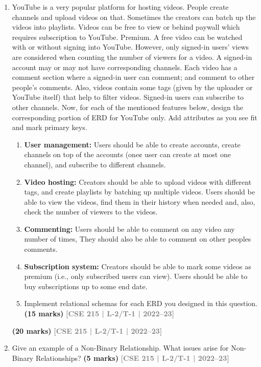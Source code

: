 \documentclass[12pt,a3paper]{article}
\newcommand{\yr}[1]{\hfill\textcolor{gray}{\small\textbf{[#1]}}}
\newcommand{\mk}[1]{\textcolor{orange!70!black}{\small\textbf{(#1 marks)}}}
\begin{document}
\begin{enumerate}
\item YouTube is a very popular platform for hosting videos. People create channels and
upload videos on that. Sometimes the creators can batch up the videos into playlists.
Videos can be free to view or behind paywall which requires subscription to YouTube.
Premium. A free video can be watched with or without signing into YouTube. However,
only signed-in users' views are considered when counting the number of viewers for a
video. A signed-in account may or may not have corresponding channels. Each video has
a comment section where a signed-in user can comment; and comment to other people’s
comments. Also, videos contain some tags (given by the uploader or YouTube itself) that
help to filter videos. Signed-in users can subscribe to other channels. Now, for each of the
mentioned features below, design the corresponding portion of ERD for YouTube only.
Add attributes as you see fit and mark primary keys.
\begin{enumerate}
  \item \textbf{User management:} Users should be able to create accounts, create channels on top of
the accounts (one¢ user can create at most one channel), and subscribe to different
channels.
  \item \textbf{Video hosting:} Creators should be able to upload videos with different tags, and
create playlists by batching up multiple videos. Users should be able to view the videos,
find them in their history when needed and, also, check the number of viewers to the
videos.
  \item \textbf{Commenting:} Users should be able to comment on any video any number of times,
They should also be able to comment on other peoples comments.
  \item \textbf{Subscription system:} Creators should be able to mark some videos as premium (i.e.,
only subscribed users can view). Users should be able to buy subscriptions up to some
end date.

\item Implement relational schemas for each ERD you designed in this question.
\mk{15} \yr{CSE 215 | L-2/T-1 | 2022--23}
\end{enumerate}
\mk{20} \yr{CSE 215 | L-2/T-1 | 2022--23}



\item Give an example of a Non-Binary Relationship. What issues arise for Non-Binary Relationships?
\mk{5} \yr{CSE 215 | L-2/T-1 | 2022--23}


\end{enumerate}
\end{document}
